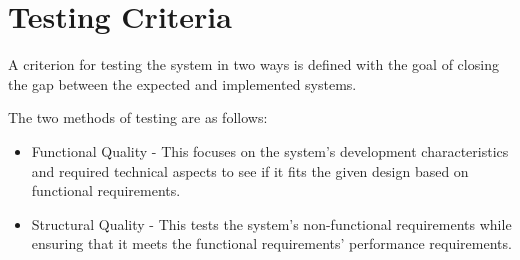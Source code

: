\section{Testing Criteria}

A criterion for testing the system in two ways is defined with the goal of closing the gap between the expected and implemented systems.

\noindent The two methods of testing are as follows:


 \begin{itemize}[noitemsep,nolistsep]
    \item Functional Quality - This focuses on the system's development characteristics and required technical aspects to see if it fits the given design based on functional requirements.
    \item Structural Quality - This tests the system's non-functional requirements while ensuring that it meets the functional requirements' performance requirements.
\end{itemize}